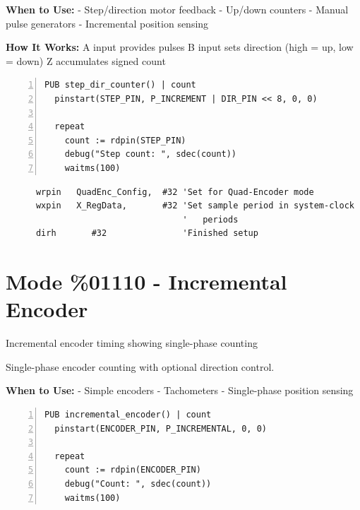 \documentclass[11pt,a4paper,oneside,english]{book}
\begin{document}
\textbf{When to Use:} - Step/direction motor feedback - Up/down counters
- Manual pulse generators - Incremental position sensing

\textbf{How It Works:} A input provides pulses B input sets direction
(high = up, low = down) Z accumulates signed count

\begin{Spin2Block}
\begin{Verbatim}[numbers=left,numbersep=5pt,xleftmargin=15pt]
PUB step_dir_counter() | count
  pinstart(STEP_PIN, P_INCREMENT | DIR_PIN << 8, 0, 0)
  
  repeat
    count := rdpin(STEP_PIN)
    debug("Step count: ", sdec(count))
    waitms(100)
\end{Verbatim}
\end{Spin2Block}

\begin{PASM2Block}
\begin{lstlisting}
      wrpin   QuadEnc_Config,  #32 'Set for Quad-Encoder mode
      wxpin   X_RegData,       #32 'Set sample period in system-clock
                                   '   periods
      dirh       #32               'Finished setup
\end{lstlisting}
\end{PASM2Block}

\clearpage

\hypertarget{mode-01110---incremental-encoder}{%
\section{Mode \%01110 - Incremental
Encoder}\label{mode-01110---incremental-encoder}}

Incremental encoder timing showing single-phase counting

Single-phase encoder counting with optional direction control.

\textbf{When to Use:} - Simple encoders - Tachometers - Single-phase
position sensing

\begin{Spin2Block}
\begin{Verbatim}[numbers=left,numbersep=5pt,xleftmargin=15pt]
PUB incremental_encoder() | count
  pinstart(ENCODER_PIN, P_INCREMENTAL, 0, 0)
  
  repeat
    count := rdpin(ENCODER_PIN)
    debug("Count: ", sdec(count))
    waitms(100)
\end{Verbatim}
\end{Spin2Block}
\end{document}
